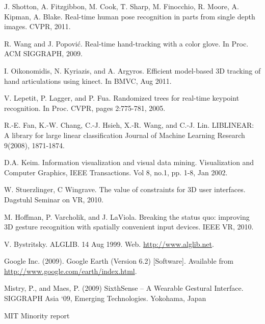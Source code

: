 \documentclass[letterpaper,twocolumn,10pt]{article}
\begin{document}

\begin{thebibliography}{9}

 J. Shotton, A. Fitzgibbon, M. Cook, T. Sharp, M. Finocchio, R. Moore, A. Kipman, A. Blake. Real-time human pose recognition in parts from single depth images. CVPR, 2011.

 R. Wang and J. Popovi\'c. Real-time hand-tracking with a color glove. In Proc. ACM SIGGRAPH, 2009.

 I. Oikonomidis, N. Kyriazis, and A. Argyros. Efficient model-based 3D tracking of hand articulations using kinect. In BMVC, Aug 2011.

 V. Lepetit, P. Lagger, and P. Fua. Randomized trees for real-time keypoint recognition. In Proc. CVPR, pages 2:775-781, 2005. 

 R.-E. Fan, K.-W. Chang, C.-J. Hsieh, X.-R. Wang, and C.-J. Lin. LIBLINEAR: A library for large linear classification Journal of Machine Learning Research 9(2008), 1871-1874.

 D.A. Keim. Information visualization and visual data mining. Visualization and Computer Graphics, IEEE Transactions. Vol 8, no.1, pp. 1-8, Jan 2002.

 W. Stuerzlinger, C Wingrave. The value of constraints for 3D user interfaces. Dagstuhl Seminar on VR, 2010.

 M. Hoffman, P. Varcholik, and J. LaViola. Breaking the status quo: improving 3D gesture recognition with spatially convenient input devices. IEEE VR, 2010.

 V. Bystritsky. ALGLIB. 14 Aug 1999. Web. \url{http://www.alglib.net}.

 Google Inc. (2009). Google Earth (Version 6.2) [Software]. Available from \url{http://www.google.com/earth/index.html}.

 Mistry, P., and Maes, P. (2009) SixthSense – A Wearable Gestural Interface. SIGGRAPH Asia ‘09, Emerging Technologies. Yokohama, Japan

 MIT Minority report

\end{thebibliography}
\end{document}
